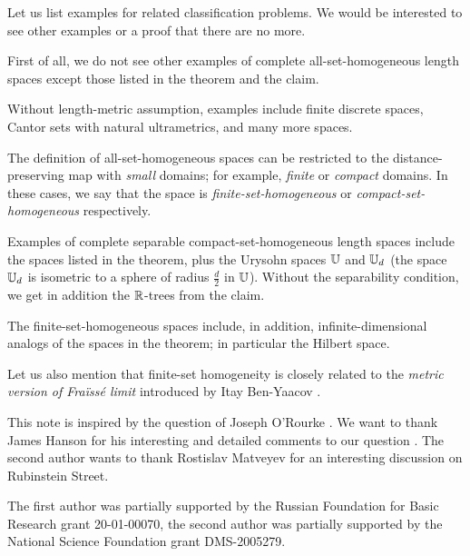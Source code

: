 \documentclass[a4paper,10pt]{article}
\begin{document}
Let us list examples for related classification problems.
We would be interested to see other examples or a proof that there are no more. 

First of all, we do not see other examples of complete all-set-homogeneous length spaces except those listed in the theorem and the claim.

Without length-metric assumption, examples include finite discrete spaces, Cantor sets with natural ultrametrics, and many more spaces.

The definition of all-set-homogeneous spaces can be restricted to the distance-preserving map with \emph{small} domains; for example, \emph{finite} or \emph{compact} domains.
In these cases, we say that the space is \emph{finite-set-homogeneous} or \emph{compact-set-homogeneous} respectively.

Examples of complete separable compact-set-homogeneous length spaces include the spaces listed in the theorem,
plus the Urysohn spaces $\mathbb{U}$ and $\mathbb{U}_d$ (the space $\mathbb{U}_d$ is isometric to a sphere of radius $\tfrac d2$ in $\mathbb{U}$).
Without the separability condition, we get in addition the $\mathbb{R}$-trees from the claim.

The finite-set-homogeneous spaces include, in addition, infinite-dimensional analogs of the spaces in the theorem;
in particular the Hilbert space.  

Let us also mention that finite-set homogeneity is closely related to the \emph{metric version of Fraïssé limit} introduced by Itay Ben-Yaacov \cite{ben-yaacov}. 

This note is inspired by the question of Joseph O'Rourke \cite{rourke}.
We want to thank James Hanson for his interesting and detailed comments to our question \cite{hanson}.
The second author wants to thank Rostislav Matveyev for an interesting discussion on Rubinstein Street. 

The first author was partially supported by the Russian Foundation for Basic Research grant 20-01-00070, the second author was partially supported by the National Science Foundation grant DMS-2005279.

{\sloppy
\printbibliography[heading=bibintoc]
\fussy
}
\end{document}
